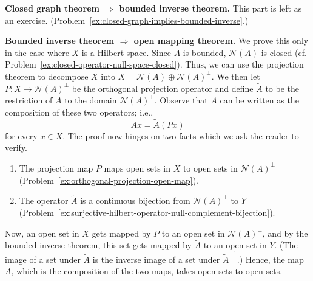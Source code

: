 \begin{Proof}
\textbf{Closed graph theorem $\Rightarrow$ bounded inverse theorem.} This part is left as an exercise. (Problem~\ref{ex:closed-graph-implies-bounded-inverse}.)

\textbf{Bounded inverse theorem $\Rightarrow$ open mapping theorem.} We prove this only in the case where $X$ is a Hilbert space. Since $A$ is bounded, $\mathcal{N}(A)$ is closed (cf. Problem~\ref{ex:closed-operator-null-space-closed}). Thus, we can use the projection theorem to decompose $X$ into $X=\mathcal{N}(A)\oplus\mathcal{N}(A)^\perp$. We then let $P:X\to\mathcal{N}(A)^\perp$ be the orthogonal projection operator and define $\widetilde A$ to be the restriction of $A$ to the domain $\mathcal{N}(A)^\perp$. Observe that $A$ can be written as the composition of these two operators; i.e.,\[Ax=\widetilde A(Px)\]for every $x\in X$. The proof now hinges on two facts which we ask the reader to verify.\begin{enumerate}\item The projection map $P$ maps open sets in $X$ to open sets in $\mathcal{N}(A)^\perp$ (Problem~\ref{ex:orthogonal-projection-open-map}).\item The operator $\widetilde A$ is a continuous bijection from $\mathcal{N}(A)^\perp$ to $Y$ (Problem~\ref{ex:surjective-hilbert-operator-null-complement-bijection}).\end{enumerate}Now, an open set in $X$ gets mapped by $P$ to an open set in $\mathcal{N}(A)^\perp$, and by the bounded inverse theorem, this set gets mapped by $\widetilde A$ to an open set in $Y$. (The image of a set under $\widetilde A$ is the inverse image of a set under $\widetilde A^{-1}$.) Hence, the map $A$, which is the composition of the two maps, takes open sets to open sets.
\end{Proof}
\endgroup
